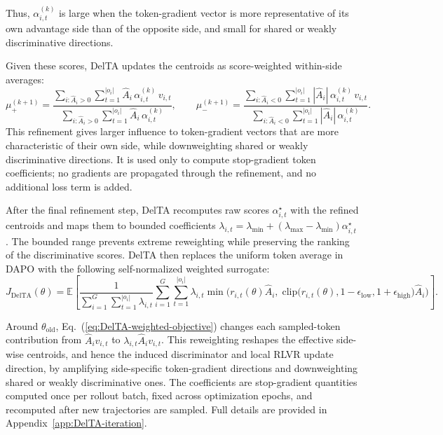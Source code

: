 \documentclass{llmxive}
\providecommand{\Eq}[1]{Eq.~(\ref{#1})}
\begin{document}
Thus, \(\alpha_{i,t}^{(k)}\) is large when the token-gradient vector is more representative of its own advantage side than of the opposite side, and small for shared or weakly discriminative directions. 

Given these scores, DelTA updates the centroids as score-weighted within-side averages:
\begin{equation}
\label{eq:DelTA-center-update}
\mu_+^{(k+1)}
=
\frac{
\sum_{i:\hat A_i>0}\sum_{t=1}^{|o_i|}
\hat A_i\,\alpha_{i,t}^{(k)}\,v_{i,t}
}{
\sum_{i:\hat A_i>0}\sum_{t=1}^{|o_i|}
\hat A_i\,\alpha_{i,t}^{(k)}
},
\qquad
\mu_-^{(k+1)}
=
\frac{
\sum_{i:\hat A_i<0}\sum_{t=1}^{|o_i|}
|\hat A_i|\,\alpha_{i,t}^{(k)}\,v_{i,t}
}{
\sum_{i:\hat A_i<0}\sum_{t=1}^{|o_i|}
|\hat A_i|\,\alpha_{i,t}^{(k)}
}.
\end{equation}
This refinement gives larger influence to token-gradient vectors that are more characteristic of their own side, while downweighting shared or weakly discriminative directions. 
It is used only to compute stop-gradient token coefficients; no gradients are propagated through the refinement, and no additional loss term is added.

After the final refinement step, DelTA recomputes raw scores \(\alpha_{i,t}^{\star}\) with the refined centroids and maps them to bounded coefficients \(\lambda_{i,t}=\lambda_{\min}+(\lambda_{\max}-\lambda_{\min})\alpha_{i,t}^{\star}\). 
The bounded range prevents extreme reweighting while preserving the ranking of the discriminative scores. 
DelTA then replaces the uniform token average in DAPO with the following self-normalized weighted surrogate:
\begin{equation}
\label{eq:DelTA-weighted-objective}
J_{\mathrm{DelTA}}(\theta)
=
\mathbb{E}\!\left[
\frac{
1
}{
\sum_{i=1}^{G}\sum_{t=1}^{|o_i|}\lambda_{i,t}
}
\sum_{i=1}^{G}\sum_{t=1}^{|o_i|}
\lambda_{i,t}
\min\!\Big(
r_{i,t}(\theta)\hat A_i,\;
\mathrm{clip}\!\big(
r_{i,t}(\theta),
1-\epsilon_{\mathrm{low}},
1+\epsilon_{\mathrm{high}}
\big)\hat A_i
\Big)
\right].
\end{equation}

Around \(\theta_{\mathrm{old}}\), \Eq{eq:DelTA-weighted-objective} changes each sampled-token contribution from \(\hat A_i v_{i,t}\) to \(\lambda_{i,t}\hat A_i v_{i,t}\). 
This reweighting reshapes the effective side-wise centroids, and hence the induced discriminator and local RLVR update direction, by amplifying side-specific token-gradient directions and downweighting shared or weakly discriminative ones. 
The coefficients are stop-gradient quantities computed once per rollout batch, fixed across optimization epochs, and recomputed after new trajectories are sampled. 
Full details are provided in Appendix~\ref{app:DelTA-iteration}.
\end{document}
